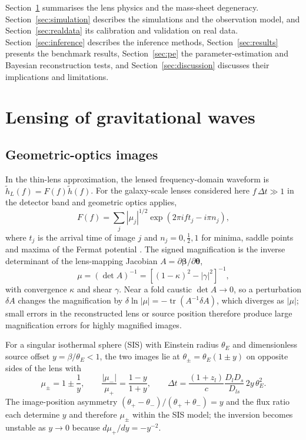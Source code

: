 Section~\ref{sec:physics} summarises the lens physics and the mass-sheet degeneracy. Section~\ref{sec:simulation} describes the simulations and the observation model, and Section~\ref{sec:realdata} its calibration and validation on real data. Section~\ref{sec:inference} describes the inference methods, Section~\ref{sec:results} presents the benchmark results, Section~\ref{sec:pe} the parameter-estimation and Bayesian reconstruction tests, and Section~\ref{sec:discussion} discusses their implications and limitations.

\section{Lensing of gravitational waves}
\label{sec:physics}
\subsection{Geometric-optics images}
In the thin-lens approximation, the lensed frequency-domain waveform is $\tilde h_L(f)=F(f)\tilde h(f)$. For the galaxy-scale lenses considered here $f\,\Delta t\gg1$ in the detector band and geometric optics applies,
\begin{equation}
F(f)=\sum_j |\mu_j|^{1/2}\exp\left(2\pi i f t_j-i\pi n_j\right),
\label{eq:go}
\end{equation}
where $t_j$ is the arrival time of image $j$ and $n_j=0,\tfrac12,1$ for minima, saddle points and maxima of the Fermat potential \citep{schneider1992gravitationallenses,takahashi2003waveeffects,dai2017morse}. The signed magnification is the inverse determinant of the lens-mapping Jacobian $A=\partial\boldsymbol\beta/\partial\boldsymbol\theta$,
\begin{equation}
\mu=\left(\det A\right)^{-1}=\left[(1-\kappa)^2-|\gamma|^2\right]^{-1},
\label{eq:jacobian}
\end{equation}
with convergence $\kappa$ and shear $\gamma$. Near a fold caustic $\det A\to0$, so a perturbation $\delta A$ changes the magnification by $\delta\ln|\mu|=-\operatorname{tr}(A^{-1}\delta A)$, which diverges as $|\mu|$; small errors in the reconstructed lens or source position therefore produce large magnification errors for highly magnified images.

For a singular isothermal sphere (SIS) with Einstein radius $\theta_E$ and dimensionless source offset $y=\beta/\theta_E<1$, the two images lie at $\theta_\pm=\theta_E(1\pm y)$ on opposite sides of the lens with
\begin{equation}
\mu_\pm=1\pm\frac1y,\qquad \frac{|\mu_-|}{\mu_+}=\frac{1-y}{1+y},\qquad \Delta t=\frac{(1+z_l)}{c}\frac{D_lD_s}{D_{ls}}\,2y\,\theta_E^2 .
\label{eq:sis}
\end{equation}
The image-position asymmetry $(\theta_+-\theta_-)/(\theta_++\theta_-)=y$ and the flux ratio each determine $y$ and therefore $\mu_\pm$ within the SIS model; the inversion becomes unstable as $y\to0$ because $d\mu_+/dy=-y^{-2}$.


